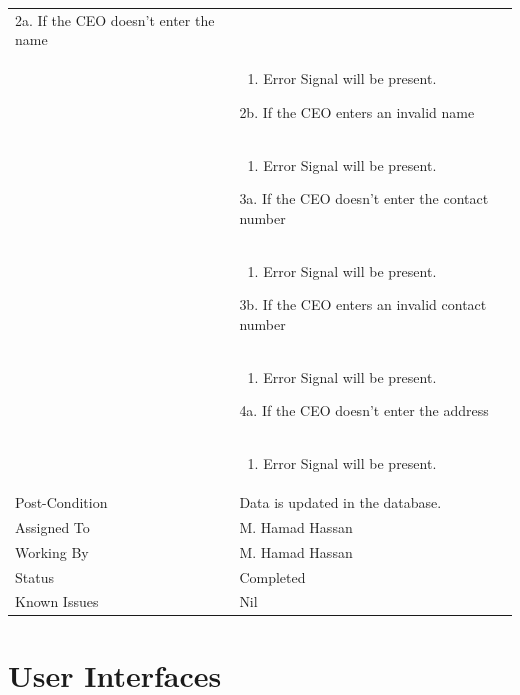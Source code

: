 \documentclass[12pt,a4paper]{article}
\begin{document}
\begin{longtable}{| p{3cm}|p{12cm}|}
2a.  If the CEO doesn't enter the name\\ 	
&	\begin{enumerate}
		\item Error Signal will be present.
	\end{enumerate}
2b. If the CEO enters an invalid name \\ 	
&	\begin{enumerate}
		\item Error Signal will be present.
	\end{enumerate}
3a.  If the CEO doesn't enter the contact number\\ 	
&	\begin{enumerate}
		\item Error Signal will be present.
	\end{enumerate}
3b. If the CEO enters an invalid contact number\\ 	
&	\begin{enumerate}
		\item Error Signal will be present.
	\end{enumerate}
4a.  If the CEO doesn't enter the address\\ 	
&	\begin{enumerate}
		\item Error Signal will be present.
	\end{enumerate}
\\ \hline
Post-Condition &  Data is updated in the database. \\\hline
Assigned To &  M. Hamad Hassan
\\ \hline
Working By &    M. Hamad Hassan
\\ \hline
Status & 	Completed	
\\ \hline
Known Issues & Nil
\\\hline
\end{longtable}
\section{User Interfaces}
\end{document}

